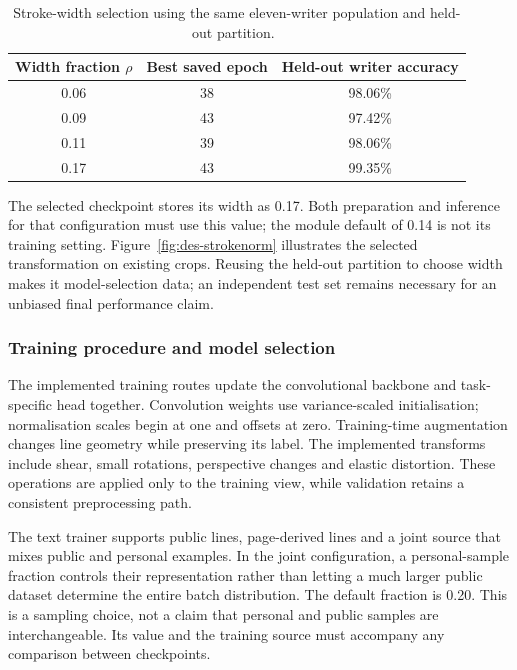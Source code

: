 \begin{table}[!htbp]\centering\small
\begin{tabular}{|c|c|c|}
\hline\textbf{Width fraction $\rho$}&\textbf{Best saved epoch}&\textbf{Held-out writer accuracy}\\\hline
0.06&38&98.06\%\\\hline
0.09&43&97.42\%\\\hline
0.11&39&98.06\%\\\hline
0.17&43&99.35\%\\\hline
\end{tabular}
\caption{Stroke-width selection using the same eleven-writer population and held-out partition.~\cite{brauneevidence2026,braunepipeline2026}}
\label{tab:des-widthselection}
\end{table}

The selected checkpoint stores its width as 0.17. Both preparation and inference for that configuration must use this value; the module default of 0.14 is not its training setting. Figure~\ref{fig:des-strokenorm} illustrates the selected transformation on existing crops. Reusing the held-out partition to choose width makes it model-selection data; an independent test set remains necessary for an unbiased final performance claim.~\cite[training records]{brauneevidence2026}


\subsubsection{Training procedure and model selection}
\label{sec:des-training}
The implemented training routes update the convolutional backbone and task-specific head together. Convolution weights use variance-scaled initialisation; normalisation scales begin at one and offsets at zero. Training-time augmentation changes line geometry while preserving its label. The implemented transforms include shear, small rotations, perspective changes and elastic distortion. These operations are applied only to the training view, while validation retains a consistent preprocessing path.~\cite[recognise.py; train.py; trainlibrary.py]{braunepipeline2026}


The text trainer supports public lines, page-derived lines and a joint source that mixes public and personal examples. In the joint configuration, a personal-sample fraction controls their representation rather than letting a much larger public dataset determine the entire batch distribution. The default fraction is 0.20. This is a sampling choice, not a claim that personal and public samples are interchangeable. Its value and the training source must accompany any comparison between checkpoints.~\cite[recognise.py; train.py; trainlibrary.py]{braunepipeline2026}

